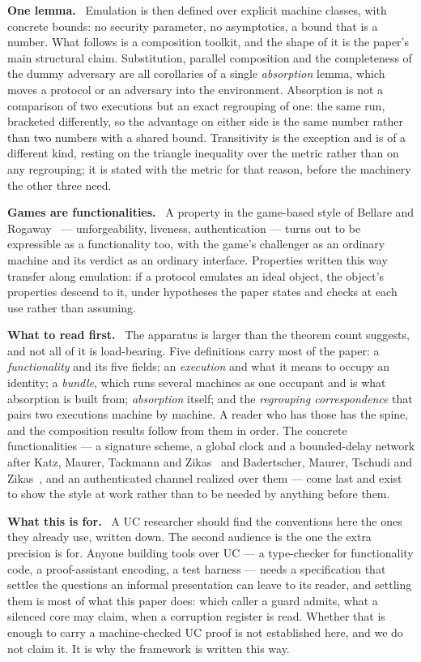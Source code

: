 \documentclass[10pt,oneside,openany]{book}
\newcommand{\heading}[1]{\medskip\par\noindent\textcolor{accent}{\textbf{#1.}}\ }
\theoremstyle{accentdef}
\theoremstyle{accentplain}
\begin{document}
\heading{One lemma} Emulation is then defined over explicit machine classes, with concrete bounds:
no security parameter, no asymptotics, a bound that is a number. What follows is a composition
toolkit, and the shape of it is the paper's main structural claim. Substitution, parallel
composition and the completeness of the dummy adversary are all corollaries of a single
\emph{absorption} lemma, which moves a protocol or an adversary into the environment. Absorption is
not a comparison of two executions but an exact regrouping of one: the same run, bracketed
differently, so the advantage on either side is the same number rather than two numbers with a
shared bound. Transitivity is the exception and is of a different kind, resting on the triangle
inequality over the metric rather than on any regrouping; it is stated with the metric for that
reason, before the machinery the other three need.

\heading{Games are functionalities} A property in the game-based style of Bellare and
Rogaway~\cite{BR06} --- unforgeability, liveness, authentication --- turns out to be expressible as
a functionality too, with the game's challenger as an ordinary machine and its verdict as an
ordinary interface. Properties written this way transfer along emulation: if a protocol emulates an
ideal object, the object's properties descend to it, under hypotheses the paper states and checks at
each use rather than assuming.

\heading{What to read first} The apparatus is larger than the theorem count suggests, and not all of
it is load-bearing. Five definitions carry most of the paper: a \emph{functionality} and its five
fields; an \emph{execution} and what it means to occupy an identity; a \emph{bundle}, which runs
several machines as one occupant and is what absorption is built from; \emph{absorption} itself; and
the \emph{regrouping correspondence} that pairs two executions machine by machine. A reader who has
those has the spine, and the composition results follow from them in order. The concrete
functionalities --- a signature scheme, a global clock and a bounded-delay network after Katz,
Maurer, Tackmann and Zikas~\cite{KMTZ13} and Badertscher, Maurer, Tschudi and Zikas~\cite{BMTZ17},
and an authenticated channel realized over them --- come last and exist to show the style at work
rather than to be needed by anything before them.

\heading{What this is for} A UC researcher should find the conventions here the ones they already
use, written down. The second audience is the one the extra precision is for. Anyone building tools
over UC --- a type-checker for functionality code, a proof-assistant encoding, a test harness ---
needs a specification that settles the questions an informal presentation can leave to its reader,
and settling them is most of what this paper does: which caller a guard admits, what a silenced
core may claim, when a corruption register is read. Whether that is enough to carry a machine-checked UC proof is not established here,
and we do not claim it. It is why the framework is written this way.
\end{document}
